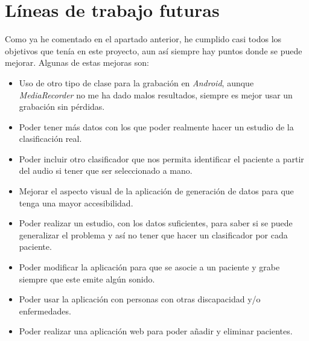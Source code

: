 \section{Líneas de trabajo futuras}
Como ya he comentado en el apartado anterior, he cumplido casi todos los objetivos que tenía en este proyecto, aun así siempre hay puntos donde se puede mejorar. Algunas de estas mejoras son:
\begin{itemize}
	\item Uso de otro tipo de clase para la grabación en \textit{Android}, aunque \textit{MediaRecorder} no me ha dado malos resultados, siempre es mejor usar un grabación sin pérdidas.
	\item Poder tener más datos con los que poder realmente hacer un estudio de la clasificación real.
	\item Poder incluir otro clasificador que nos permita identificar el paciente a partir del audio si tener que ser seleccionado a mano.
	\item Mejorar el aspecto visual de la aplicación de generación de datos para que tenga una mayor accesibilidad.
	\item Poder realizar un estudio, con los datos suficientes, para saber si se puede generalizar el problema y así no tener que hacer un clasificador por cada paciente.
	\item Poder modificar la aplicación para que se asocie a un paciente y grabe siempre que este emite algún sonido. 
	\item Poder usar la aplicación con personas con otras discapacidad y/o enfermedades.
	\item Poder realizar una aplicación web para poder añadir y eliminar pacientes.
\end{itemize}
